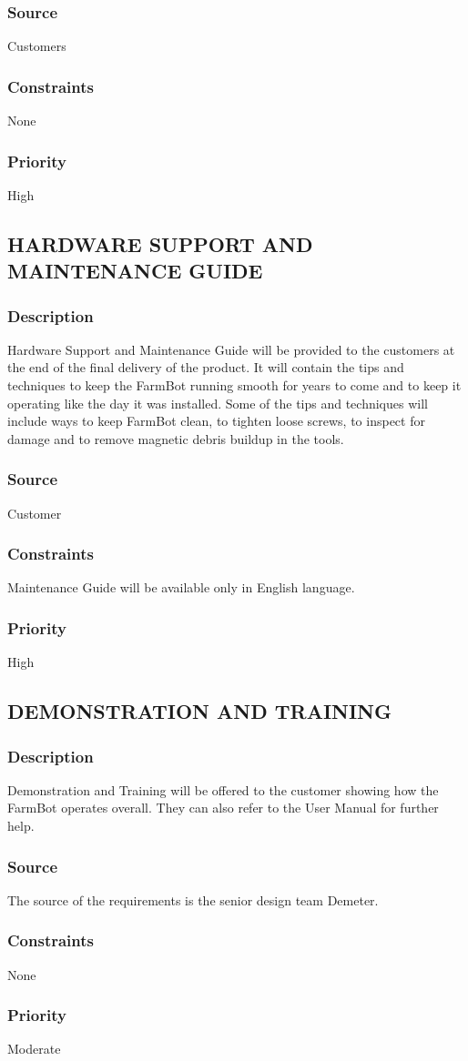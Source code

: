 \subsubsection{Source}
Customers
\subsubsection{Constraints}
None
\subsubsection{Priority}
High

\subsection{HARDWARE SUPPORT AND MAINTENANCE GUIDE}
\subsubsection{Description}
Hardware Support and Maintenance Guide will be provided to the customers at the end of the final delivery of the product. It will contain the tips and techniques to keep the FarmBot running smooth for years to come and to keep it operating like the day it was installed. Some of the tips and techniques will include ways to keep FarmBot clean, to tighten loose screws, to inspect for damage and to remove magnetic debris buildup in the tools.
\subsubsection{Source}
Customer
\subsubsection{Constraints}
Maintenance Guide will be available only in English language.
\subsubsection{Priority}
High

\subsection{DEMONSTRATION AND TRAINING}
\subsubsection{Description}
Demonstration and Training will be offered to the customer showing how the FarmBot operates overall. They can also refer to the User Manual for further help.
\subsubsection{Source}
The source of the requirements is the senior design team Demeter.
\subsubsection{Constraints}
None
\subsubsection{Priority}
Moderate